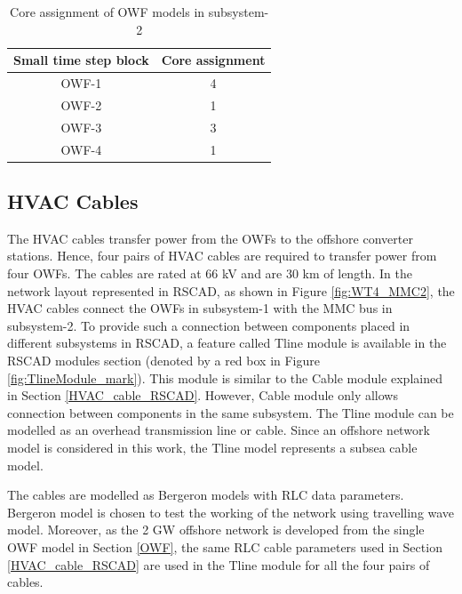 \begin{table}[H]
\centering
\begin{tabular}{|c|c|}
\hline
\textbf{Small time step block} & \textbf{Core assignment} \\ \hline
OWF-1                          & 4                        \\ \hline
OWF-2                          & 1                        \\ \hline
OWF-3                          & 3                        \\ \hline
OWF-4                          & 1                        \\ \hline
\end{tabular}
\caption{Core assignment of OWF models in subsystem-2}
\label{tab:Core_assignment_sub2}
\end{table}

\subsection{HVAC Cables}\label{Tline_cable_RSCAD}
The \gls{HVAC} cables transfer power from the \gls{OWF}s to the offshore converter stations. Hence, four pairs of \gls{HVAC} cables are required to transfer power from four \gls{OWF}s. The cables are rated at 66 kV and are 30 km of length. In the network layout represented in RSCAD, as shown in Figure \ref{fig:WT4_MMC2}, the \gls{HVAC} cables connect the \gls{OWF}s in subsystem-1 with the \gls{MMC} bus in subsystem-2. To provide such a connection between components placed in different subsystems in RSCAD, a feature called Tline module is available in the RSCAD modules section (denoted by a red box in Figure \ref{fig:TlineModule_mark}). This module is similar to the Cable module explained in Section \ref{HVAC_cable_RSCAD}. However, Cable module only allows connection between components in the same subsystem. The Tline module can be modelled as an overhead transmission line or cable. Since an offshore network model is considered in this work, the Tline model represents a subsea cable model. 

The cables are modelled as Bergeron models with RLC data parameters. Bergeron model is chosen to test the working of the network using travelling wave model. Moreover, as the 2 GW offshore network is developed from the single \gls{OWF} model in Section \ref{OWF}, the same RLC cable parameters used in Section \ref{HVAC_cable_RSCAD} are used in the Tline module for all the four pairs of cables. 
 
